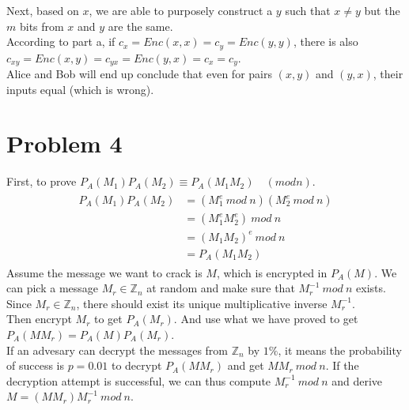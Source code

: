 \documentclass[titlepage, paper=a4, fontsize=11pt]{scrartcl} %
\numberwithin{equation}{section} %
\numberwithin{figure}{section} %
\numberwithin{table}{section} %
\begin{document}
Next, based on $x$, we are able to purposely construct a $y$ such that $x \neq y$ but the $m$ bits from
$x$ and $y$ are the same. \\

According to part a, if $c_x=Enc(x,x)=c_y=Enc(y,y)$, there is also $c_{xy}=Enc(x,y)=c_{yx}=Enc(y,x)=c_x=c_y$. \\

Alice and Bob will end up conclude that even for pairs $(x,y)$ and $(y,x)$, their inputs equal (which is wrong).
\\



\section*{Problem 4}
First, to prove $P_A(M_1)P_A(M_2) \equiv P_A(M_1M_2) \quad (mod n)$.
\begin{align*} 
\begin{split}
P_A(M_1)P_A(M_2) &= (M_1^e \  mod \ n )(M_2^e \  mod \ n ) \\
&= (M_1^eM_2^e) \ mod \ n \\
&= (M_1M_2)^e \ mod \ n \\
&= P_A(M_1M_2)
\end{split}					
\end{align*}
Assume the message we want to crack is $M$, which is encrypted in $P_A(M)$.
We can pick a message $M_r \in \mathbb{Z}_n$ at random and make sure that $M_{r}^{-1} \ mod \ n$ exists.
Since $M_r \in \mathbb{Z}_n$, there should exist its unique multiplicative inverse $M_r^{-1}$. \\

Then encrypt $M_r$ to get $P_A(M_r)$. And use what we have proved to get
$P_A(MM_r) = P_A(M)P_A(M_r)$. \\

If an advesary can decrypt the messages from $\mathbb{Z}_n$ by $1\%$, it means the probability of success
is $p = 0.01$ to decrypt $P_A(MM_r)$ and get $MM_r \ mod \ n$. If the decryption attempt is successful,
we can thus compute $M_r^{-1} \ mod \ n$ and derive $M = (MM_r)M_r^{-1} \ mod \ n$. \\
\end{document}
